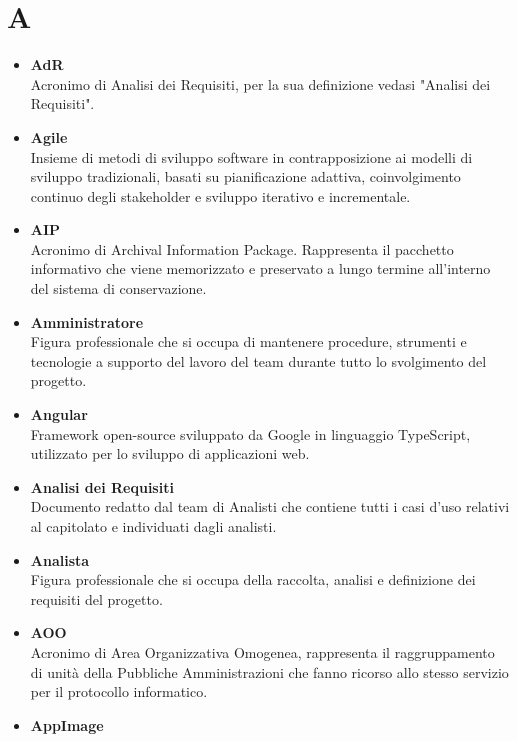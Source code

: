 \documentclass[a4paper,12pt]{article}
\begin{document}
        \section*{A} {
            \begin{itemize}
                \item \textbf{AdR}\\
                    Acronimo di Analisi dei Requisiti, per la sua definizione vedasi "Analisi dei Requisiti".
                \item \textbf{Agile}\\
                    Insieme di metodi di sviluppo software in contrapposizione ai modelli di sviluppo tradizionali, basati su pianificazione adattiva, coinvolgimento continuo degli stakeholder e sviluppo iterativo e incrementale.
                \item \textbf{AIP}\\
                    Acronimo di Archival Information Package. Rappresenta il pacchetto informativo che viene memorizzato e preservato a lungo termine all'interno del sistema di conservazione.
                \item \textbf{Amministratore}\\
                    Figura professionale che si occupa di mantenere procedure, strumenti e tecnologie a supporto del lavoro del team durante tutto lo svolgimento del progetto.
                \item \textbf{Angular}\\
                    Framework open-source sviluppato da Google in linguaggio TypeScript, utilizzato per lo sviluppo di applicazioni web.
                \item \textbf{Analisi dei Requisiti}\\
                    Documento redatto dal team di Analisti che contiene tutti i casi d'uso relativi al capitolato e individuati dagli analisti.
                \item \textbf{Analista}\\
                    Figura professionale che si occupa della raccolta, analisi e definizione dei requisiti del progetto.
                \item \textbf{AOO}\\
                    Acronimo di Area Organizzativa Omogenea, rappresenta il raggruppamento di unità della Pubbliche Amministrazioni che fanno ricorso allo stesso servizio per il protocollo informatico.
                \item \textbf{AppImage}\\

\end{itemize}}
\end{document}
